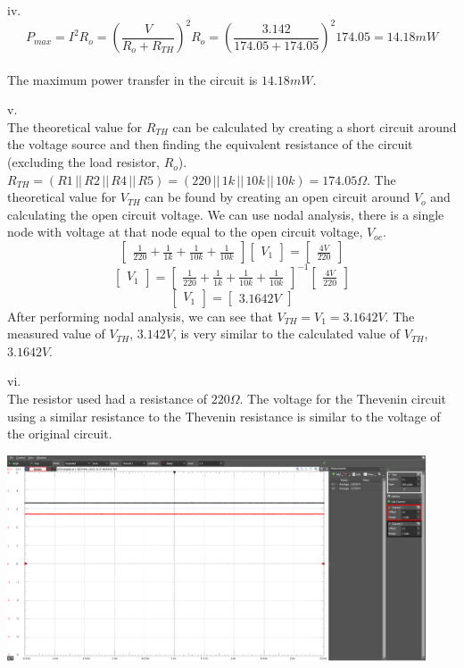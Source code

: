 \documentclass[12pt]{article}
\begin{document}
iv. \\ 
\[P_{max} = I^2R_o = (\frac{V}{R_o+R_{TH}})^2R_o = (\frac{3.142}{174.05+174.05})^{2}174.05 = 14.18 mW\] \\ 
The maximum power transfer in the circuit is $14.18 mW$.

v. \\ The theoretical value for $R_{TH}$ can be calculated by creating a short circuit around the voltage source and then finding the equivalent resistance of the circuit (excluding the load resistor, $R_o$). $R_{TH} = (R1\,||\,R2\,||\,R4\,||\,R5) = (220\,||\,1k\,||\,10k\,||\,10k) = 174.05\Omega$. The theoretical value for $V_{TH}$ can be found by creating an open circuit around $V_o$ and calculating the open circuit voltage. We can use nodal analysis, there is a single node with voltage at that node equal to the open circuit voltage, $V_{oc}$.
\[
\begin{bmatrix}
    \frac{1}{220} + \frac{1}{1k} + \frac{1}{10k} + \frac{1}{10k}
\end{bmatrix}
\begin{bmatrix}
    V_1
\end{bmatrix}
=
\begin{bmatrix}
    \frac{4V}{220}
\end{bmatrix}
\]
\[
\begin{bmatrix}
    V_1
\end{bmatrix}
=
\begin{bmatrix}
    \frac{1}{220} + \frac{1}{1k} + \frac{1}{10k} + \frac{1}{10k}
\end{bmatrix}^{-1}
\begin{bmatrix}
    \frac{4V}{220}
\end{bmatrix} 
\]
\[
\begin{bmatrix}
    V_1
\end{bmatrix}
=
\begin{bmatrix}
    3.1642V
\end{bmatrix}
\]
After performing nodal analysis, we can see that $V_{TH} = V_1 = 3.1642V$. The measured value of $V_{TH}$, $3.142V$, is very similar to the calculated value of $V_{TH}$, $3.1642V$.

vi. \\ The resistor used had a resistance of $220\Omega$. The voltage for the Thevenin circuit using a similar resistance to the Thevenin resistance is similar to the voltage of the original circuit.
\begin{center}
    \includegraphics[width=0.93\textwidth]{prelab6part6.png}
\end{center}
\end{document}
